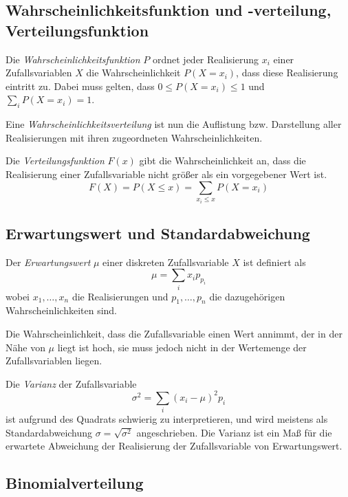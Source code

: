 \documentclass[twocolumn]{article}
\newcommand{\term}[1]{\emph{#1}}
\newcommand{\separator}{\vspace{0.5em}}
\begin{document}
\subsection{Wahrscheinlichkeitsfunktion und -verteilung, Verteilungsfunktion}

Die \term{Wahrscheinlichkeitsfunktion} $P$ ordnet jeder Realisierung $x_i$ einer Zufallsvariablen $X$ die Wahrscheinlichkeit $P(X = x_i)$, dass diese Realisierung eintritt zu. Dabei muss gelten, dass $0 \leq P(X = x_i) \leq 1$ und $\sum_{i}P(X = x_i) = 1$.
\separator

Eine \term{Wahrscheinlichkeitsverteilung} ist nun die Auflistung bzw. Darstellung aller Realisierungen mit ihren zugeordneten Wahrscheinlichkeiten.
\separator

Die \term{Verteilungsfunktion} $F(x)$ gibt die Wahrscheinlichkeit an, dass die Realisierung einer Zufallsvariable nicht größer als ein vorgegebener Wert ist.
\begin{equation*}
    F(X) = P(X \leq x) = \sum_{x_i \leq x}P(X = x_i)
\end{equation*}

\subsection{Erwartungswert und Standardabweichung}

Der \term{Erwartungswert} $\mu$ einer diskreten Zufallsvariable $X$ ist definiert als
\begin{equation*}
    \mu = \sum_{i}x_{i}p_{p_i}
\end{equation*}
wobei $x_1, \ldots, x_n$ die Realisierungen und $p_1, \ldots, p_n$ die dazugehörigen Wahrscheinlichkeiten sind.

Die Wahrscheinlichkeit, dass die Zufallsvariable einen Wert annimmt, der in der Nähe von $\mu$ liegt ist hoch, sie muss jedoch nicht in der Wertemenge der Zufallsvariablen liegen.

Die \term{Varianz} der Zufallsvariable
\begin{equation*}
    \sigma^2 = \sum_{i}(x_i - \mu)^{2}p_i
\end{equation*}
ist aufgrund des Quadrats schwierig zu interpretieren, und wird meistens als Standardabweichung $\sigma = \sqrt{\sigma^2}$ angeschrieben. Die Varianz ist ein Maß für die erwartete Abweichung der Realisierung der Zufallsvariable von Erwartungswert.

\subsection{Binomialverteilung}
\end{document}
